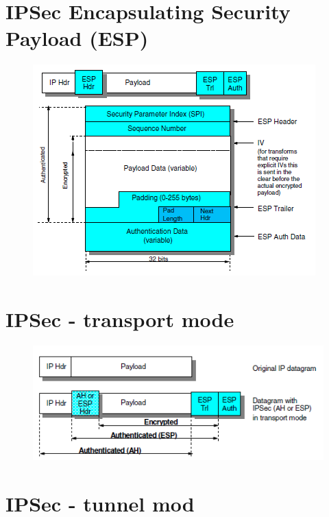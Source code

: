 \documentclass[10pt,a4paper]{article}
\begin{document}
\newpage
\section{IPSec Encapsulating Security Payload (ESP)}

\begin{figure}[hbtp]
\centering
\includegraphics[scale=1]{IPSec Encapsulating Security Payload (ESP).png}
\end{figure}




\newpage
\section{IPSec - transport mode}

\begin{figure}[hbtp]
\centering
\includegraphics[scale=1]{IPSec - transport mode.png}
\end{figure}



\newpage
\section{IPSec - tunnel mod}
\end{document}

